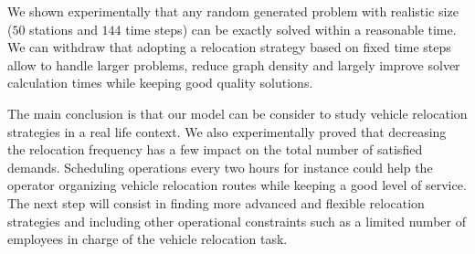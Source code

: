 We shown experimentally that any random generated problem with realistic size ($50$ stations and $144$ time steps) can be exactly solved within a reasonable time.
We can withdraw that adopting a relocation strategy based on fixed time steps allow to handle larger problems, reduce graph density and largely improve solver calculation times while keeping good quality solutions.

The main conclusion is that our model can be consider to study vehicle relocation strategies in a real life context.
We also experimentally proved that decreasing the relocation frequency has a few impact on the total number of satisfied demands.
Scheduling operations every two hours for instance could help the operator organizing vehicle relocation routes while keeping a good level of service.
The next step will consist in finding more advanced and flexible relocation strategies and including other operational constraints such as a limited number of employees in charge of the vehicle relocation task.
